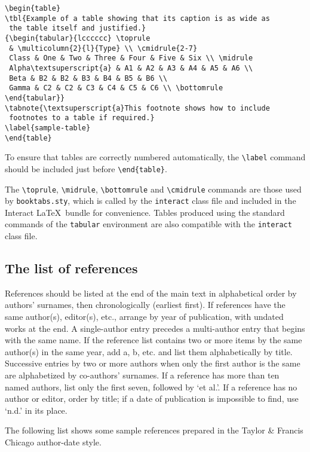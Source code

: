 \documentclass[]{interact}
\theoremstyle{plain}%
\theoremstyle{definition}
\theoremstyle{remark}
\begin{document}
\begin{verbatim}
\begin{table}
\tbl{Example of a table showing that its caption is as wide as
 the table itself and justified.}
{\begin{tabular}{lcccccc} \toprule
 & \multicolumn{2}{l}{Type} \\ \cmidrule{2-7}
 Class & One & Two & Three & Four & Five & Six \\ \midrule
 Alpha\textsuperscript{a} & A1 & A2 & A3 & A4 & A5 & A6 \\
 Beta & B2 & B2 & B3 & B4 & B5 & B6 \\
 Gamma & C2 & C2 & C3 & C4 & C5 & C6 \\ \bottomrule
\end{tabular}}
\tabnote{\textsuperscript{a}This footnote shows how to include
 footnotes to a table if required.}
\label{sample-table}
\end{table}
\end{verbatim}

To ensure that tables are correctly numbered automatically, the
\texttt{\textbackslash{}label} command should be included just before
\texttt{\textbackslash{}end\{table\}}.

The \texttt{\textbackslash{}toprule}, \texttt{\textbackslash{}midrule},
\texttt{\textbackslash{}bottomrule} and
\texttt{\textbackslash{}cmidrule} commands are those used by
\texttt{booktabs.sty}, which is called by the \texttt{interact} class
file and included in the \textsf{Interact} \LaTeX~bundle for
convenience. Tables produced using the standard commands of the
\texttt{tabular} environment are also compatible with the
\texttt{interact} class file.

\hypertarget{the-list-of-references}{%
\subsection{The list of references}\label{the-list-of-references}}

References should be listed at the end of the main text in alphabetical
order by authors' surnames, then chronologically (earliest first). If
references have the same author(s), editor(s), etc., arrange by year of
publication, with undated works at the end. A single-author entry
precedes a multi-author entry that begins with the same name. If the
reference list contains two or more items by the same author(s) in the
same year, add a, b, etc. and list them alphabetically by title.
Successive entries by two or more authors when only the first author is
the same are alphabetized by co-authors' surnames. If a reference has
more than ten named authors, list only the first seven, followed by `et
al.'. If a reference has no author or editor, order by title; if a date
of publication is impossible to find, use `n.d.' in its place.

The following list shows some sample references prepared in the Taylor
\& Francis Chicago author-date style.

\citep{Ade09, Alb05}






\end{document}

